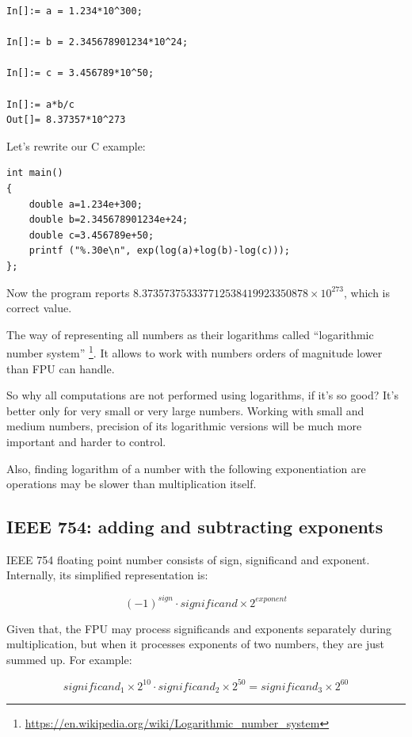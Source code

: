 \begin{lstlisting}[caption=Wolfram Mathematica]
In[]:= a = 1.234*10^300;

In[]:= b = 2.345678901234*10^24;

In[]:= c = 3.456789*10^50;

In[]:= a*b/c
Out[]= 8.37357*10^273
\end{lstlisting}

Let's rewrite our C example:

\begin{lstlisting}[caption=C code]
int main()
{
	double a=1.234e+300;
	double b=2.345678901234e+24;
	double c=3.456789e+50;
	printf ("%.30e\n", exp(log(a)+log(b)-log(c)));
};
\end{lstlisting}

Now the program reports $8.373573753337712538419923350878 \times 10^{273}$, which is correct value.

The way of representing all numbers as their logarithms called ``logarithmic number system''
\footnote{\url{https://en.wikipedia.org/wiki/Logarithmic_number_system}}.
It allows to work with numbers orders of magnitude lower than FPU can handle.

So why all computations are not performed using logarithms, if it's so good?
It's better only for very small or very large numbers.
Working with small and medium numbers, precision of its logarithmic versions will be much more important and harder to control.

Also, finding logarithm of a number with the following exponentiation are operations may be slower than multiplication itself.

\subsection{IEEE 754: adding and subtracting exponents}

IEEE 754 floating point number consists of sign, significand and exponent.
Internally, its simplified representation is:

\begin{equation}
(-1)^{sign} \cdot significand \times 2^{exponent}
\end{equation}

Given that, the FPU may process significands and exponents separately during multiplication, 
but when it processes exponents of two numbers, they are just summed up.
For example:

\begin{equation}
significand_{1} \times 2^{10} \cdot significand_{2} \times 2^{50} = significand_{3} \times 2^{60}
\end{equation}

